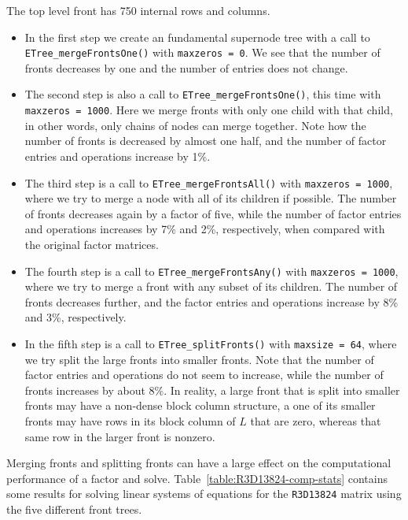 The top level front has 750 internal rows and columns.
\par
\begin{itemize}
\item
In the first step we create an fundamental supernode tree with a call to
{\tt ETree\_mergeFrontsOne()} with {\tt maxzeros = 0}.
We see that the number of fronts decreases by one and the number of
entries does not change.
\item
The second step is also a call to
{\tt ETree\_mergeFrontsOne()}, this time with {\tt maxzeros = 1000}.
Here we merge fronts with only one child with that child,
in other words, only chains of nodes can merge together.
Note how the number of fronts is decreased by almost one half, 
and the number of factor entries and operations increase by 1\%.
\item
The third step is a call to {\tt ETree\_mergeFrontsAll()}
with {\tt maxzeros = 1000}, where we try
to merge a node with all of its children if possible.
The number of fronts decreases again by a factor of five, while the
number of factor entries and operations increases by 7\% and 2\%,
respectively, when compared with the original factor matrices.
\item
The fourth step 
is a call to {\tt ETree\_mergeFrontsAny()}
with {\tt maxzeros = 1000}, where we try
to merge a front with any subset of its children.
The number of fronts decreases further, and the factor entries and
operations increase by 8\% and 3\%, respectively.
\item
In the fifth step 
is a call to {\tt ETree\_splitFronts()}
with {\tt maxsize = 64}, where we try
split the large fronts into smaller fronts.
Note that the number of factor entries and operations do not seem to
increase, while the number of fronts increases by about 8\%.
In reality, a large front that is split into smaller fronts may have a
non-dense block column structure, a one of its smaller fronts may have 
rows in its block column of $L$ that are zero, whereas that same row in
the larger front is nonzero.
\end{itemize}
Merging fronts and splitting fronts can have a large effect on the
computational performance of a factor and solve.
Table~\ref{table:R3D13824-comp-stats} contains some results for
solving linear systems of equations for the {\tt R3D13824} matrix
using the five different front trees.
\par
